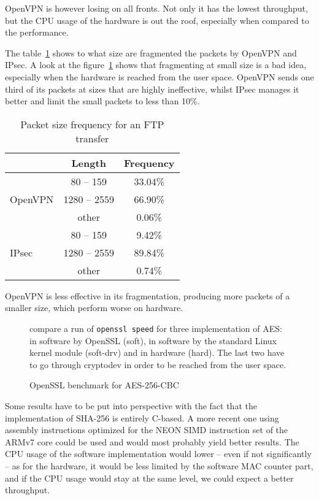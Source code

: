 OpenVPN is however losing on all fronts. Not only it has the lowest throughput, but the CPU usage of the hardware is out the roof, especially when compared to the performance.

\noindent The table~\ref{tab:ftp-fragmentation} shows to what size are fragmented the packets by OpenVPN and IPsec.
A look at the figure~\ref{fig:openssl-speed} shows that fragmenting at small size is a bad idea, especially when the hardware is reached from the user space.
OpenVPN sends one third of its packets at sizes that are highly ineffective, whilst IPsec manages it better and limit the small packets to less than 10\%.

\begin{table}
\center
\begin{tabular}{l|c|c|} \cline{2-3}
 & Length & Frequency \\ \hline
\multicolumn{1}{|l|}{\multirow{3}{*}{OpenVPN}} & 80 -- 159 & 33.04\% \\ \cline{2-3}
\multicolumn{1}{|l|}{} & 1280 -- 2559 & 66.90\% \\ \cline{2-3}
\multicolumn{1}{|l|}{} & other & 0.06\% \\ \hline
\multicolumn{1}{|l|}{\multirow{3}{*}{IPsec}} & 80 -- 159 & 9.42\% \\ \cline{2-3}
\multicolumn{1}{|l|}{} & 1280 -- 2559 & 89.84\% \\ \cline{2-3}
\multicolumn{1}{|l|}{} & other & 0.74\% \\ \hline
\end{tabular}
\caption{Packet size frequency for an FTP transfer}{OpenVPN is less effective in its fragmentation, producing more packets of a smaller size, which perform worse on hardware.}
\label{tab:ftp-fragmentation}
\end{table}


\begin{figure}[ht]

\caption{OpenSSL benchmark for AES-256-CBC}{compare a run of \texttt{openssl speed} for three implementation of AES: in software by OpenSSL (soft), in software by the standard Linux kernel module (soft-drv) and in hardware (hard). The last two have to go through cryptodev in order to be reached from the user space.}
\label{fig:openssl-speed}
\end{figure}

Some results have to be put into perspective with the fact that the implementation of SHA-256 is entirely C-based.
A more recent one using assembly instructions optimized for the NEON SIMD instruction set of the ARMv7 core could be used and would most probably yield better results.
The CPU usage of the software implementation would lower -- even if not significantly -- as for the hardware, it would be less limited by the software MAC counter part, and if the CPU usage would stay at the same level, we could expect a better throughput.

